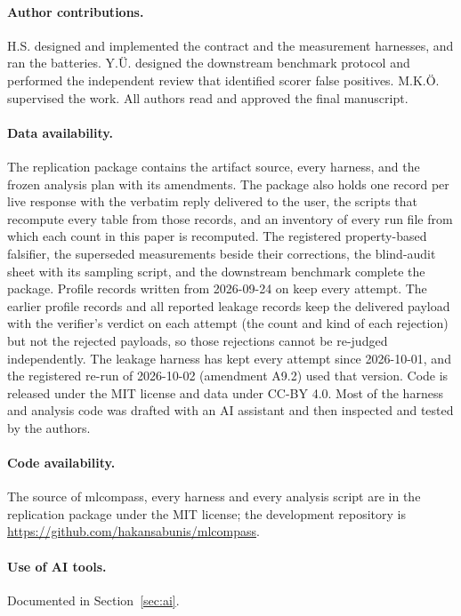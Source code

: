 \documentclass[smallextended,natbib]{svjour3}
\begin{document}
\paragraph{Author contributions.} H.S. designed and implemented the contract
and the measurement harnesses, and ran the batteries. Y.\"U. designed the
downstream benchmark protocol and performed the independent review that
identified scorer false positives. M.K.\"O. supervised the work. All authors
read and approved the final manuscript.

\paragraph{Data availability.} The replication package \citep{replication} contains the artifact source,
every harness, and the frozen analysis plan with its amendments. The package
also holds one record per live response with the verbatim reply delivered to
the user, the scripts that recompute every table from those records, and an
inventory of every run file from which each count in this paper is
recomputed. The registered property-based falsifier, the superseded
measurements beside their corrections, the blind-audit sheet with its sampling
script, and the downstream benchmark complete the package.
Profile records written from 2026-09-24 on keep every attempt. The earlier
profile records and all reported leakage records keep the delivered payload
with the verifier's verdict on each attempt (the count and kind of each
rejection) but not the rejected payloads, so those rejections cannot be
re-judged independently. The leakage harness has kept every attempt since
2026-10-01, and the registered re-run of 2026-10-02 (amendment A9.2) used that
version. Code is released under the MIT
license and data under CC-BY 4.0. Most of the harness and analysis code was
drafted with an AI assistant and then inspected and tested by the authors.

\paragraph{Code availability.} The source of mlcompass, every harness and every
analysis script are in the replication package \citep{replication} under the
MIT license; the development repository is
\url{https://github.com/hakansabunis/mlcompass}.

\paragraph{Use of AI tools.} Documented in Section~\ref{sec:ai}.



\end{document}
